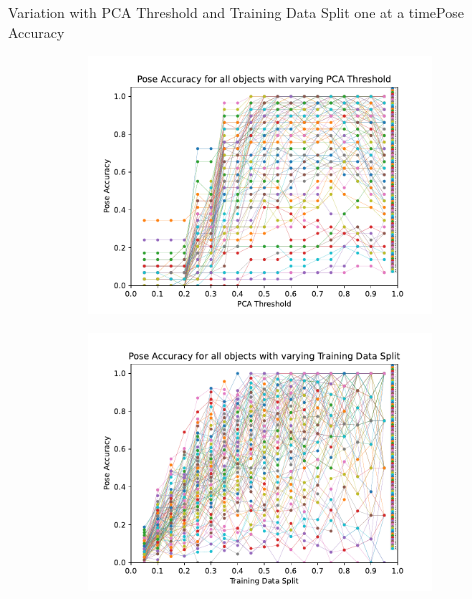 \documentclass[aspectratio=169, handout, 10pt, hyperref=colorlinks]{beamer}
\begin{document}
\begin{frame}{Variation with PCA Threshold and Training Data Split one at a time}{Pose Accuracy}
    \begin{figure}
        \centering
        \begin{subfigure}{0.48\linewidth}
            \centering
            \includegraphics[width=\linewidth]{pca/pose_accuracy_all_objects.pdf}
        \end{subfigure}
        \begin{subfigure}{0.48\linewidth}
            \centering
            \includegraphics[width=\linewidth]{tds/pose_accuracy_all_objects.pdf}
        \end{subfigure}
    \end{figure}
\end{frame}
\end{document}
